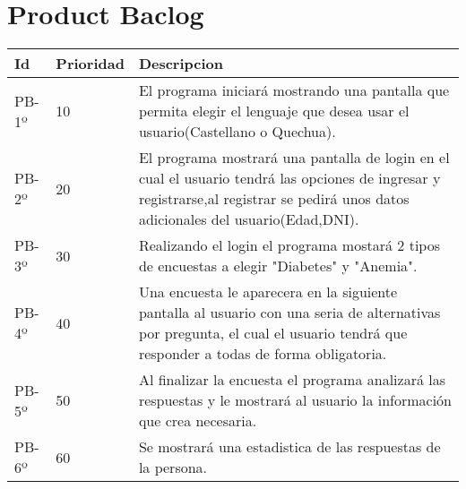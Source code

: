 \chapter{Product Baclog}



\begin{table}[htbp]
	\begin{center}
		\begin{tabular}{| p{2.1cm}| p{2.1cm} |p{8.2cm} |}
			\hline
			\textbf{Id} & \textbf {Prioridad} & \textbf{Descripcion} \\\hline    
			PB-1º & 10 & El programa iniciará mostrando una pantalla que permita elegir el lenguaje que desea usar el usuario(Castellano o Quechua).\\ \hline
			PB-2º & 20 & El programa mostrará una pantalla de login en el cual el usuario tendrá las opciones de ingresar y registrarse,al registrar se pedirá unos datos adicionales del usuario(Edad,DNI).\\ \hline
			PB-3º & 30 & Realizando el login el programa mostará 2 tipos de encuestas a elegir "Diabetes" y "Anemia".\\ \hline
			PB-4º & 40 & Una encuesta le aparecera en la siguiente pantalla al usuario con una seria de alternativas por pregunta, 
			el cual el usuario tendrá que responder a todas de forma obligatoria.\\ \hline
			PB-5º & 50 & Al finalizar la encuesta el programa analizará las respuestas y le mostrará al usuario la información que crea necesaria.\\ \hline
			PB-6º & 60 & Se mostrará una estadistica de las respuestas de la persona.\\ \hline
		\end{tabular}
	\end{center}
\end{table}
